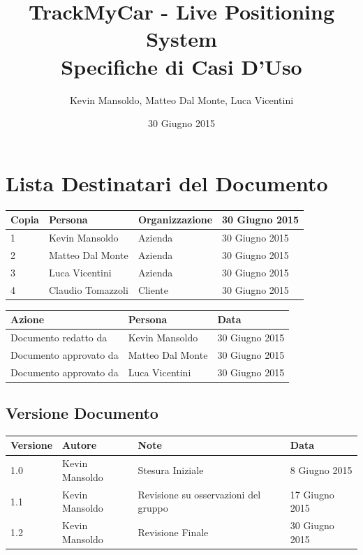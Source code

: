 \documentclass[a4paper,12pt]{article}
\begin{document}
\title{\textbf{TrackMyCar - Live Positioning System}\\Specifiche di Casi D'Uso}

\author{Kevin Mansoldo, Matteo Dal Monte, Luca Vicentini}
\date{30 Giugno 2015}
\maketitle
\pagebreak

\tableofcontents
\pagebreak

\section{Lista Destinatari del Documento}

\begin{table}[ht]
\begin{center}
\begin{tabular}{p{1cm} p{4.5cm} p{3.5cm} p{3.5cm}}
\rowcolor{Ash}
\hline
Copia & Persona & Organizzazione & 30 Giugno 2015 \\ \hline
1 & Kevin Mansoldo & Azienda & 30 Giugno 2015 \\ 
2 & Matteo Dal Monte & Azienda & 30 Giugno 2015 \\ 
3 & Luca Vicentini & Azienda & 30 Giugno 2015 \\ 
4 & Claudio Tomazzoli & Cliente & 30 Giugno 2015 \\ \hline
\end{tabular}
\end{center}


\begin{center}
\begin{tabular}{p{6cm} p{3.5cm} p{3.5cm}}
\rowcolor{Ash}
\hline
Azione & Persona & Data \\ \hline
Documento redatto da & Kevin Mansoldo & 30 Giugno 2015 \\ 
Documento approvato da & Matteo Dal Monte & 30 Giugno 2015 \\ 
Documento approvato da & Luca Vicentini & 30 Giugno 2015 \\ \hline
\end{tabular}
\end{center}
\end{table}

\subsection{Versione Documento}
\begin{table}[ht]
\begin{center}
\begin{tabular}{p{1cm} p{3cm} p{5cm} p{3.5cm}}
\rowcolor{Ash}
\hline
Versione & Autore & Note & Data \\ \hline
1.0 & Kevin Mansoldo & Stesura Iniziale & 8 Giugno 2015 \\ 
1.1 & Kevin Mansoldo & Revisione su osservazioni del gruppo & 17 Giugno 2015 \\ 
1.2 & Kevin Mansoldo & Revisione Finale & 30 Giugno 2015 \\ \hline
\end{tabular}
\end{center}
\end{table}
\end{document}
